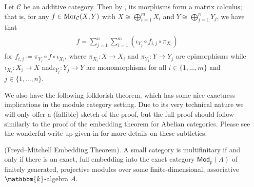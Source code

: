 \noindent\begin{remark}\label{MatrixCalculus} Let $\mathcal{C}$ be an additive category. Then by \cite[\S VIII.2]{Mac13}, its morphisms form a matrix calculus; that is, for any $f \in \textnormal{Mor}_\mathcal{C}(X, Y)$ with $X \cong \bigoplus_{i=1}^m{X_i}$ and $Y \cong \bigoplus_{j=1}^n{Y_j}$, we have that\\[-\linespacing]
\begin{align*}
\begin{split}
f = \sum_{j=1}^n{\sum_{i=1}^m{(\iota_{Y_j} \circ f_{i,j} \circ \pi_{X_i})}}
\end{split}
\end{align*}
\noindent for $f_{i,j} \coloneqq \pi_{Y_j} \circ f \circ \iota_{X_i}$, where $\pi_{X_i} : X \to X_i$ and $\pi_{Y_j} : Y \to Y_j$ are epimorphisms while $\iota_{X_i} : X_i \to X$ and\linebreak $\iota_{Y_j} : Y_j \to Y$ are monomorphisms for all $i \in \{1, \dots, m\}$ and $j \in \{1, \dots, n\}$.\\
\end{remark}

\noindent We also have the following folklorish theorem, which has some nice exactness implications in the module category setting. Due to its very technical nature we will only offer a (fallible) sketch of the proof, but the full proof should follow similarly to the proof of the embedding theorem for Abelian categories. Please see the wonderful write-up given in \cite{Jun19} for more details on these subtleties.\newpage

\noindent\begin{theorem}\textnormal{(Freyd--Mitchell Embedding Theorem).}\label{FreydMitchell} A small category is multifinitary if and only if there is an exact, full embedding into the exact category $\mathsf{Mod}_p(A)$ of finitely generated, projective modules over some finite-dimensional, associative $\mathbbm{k}$-algebra $A$.\\
\end{theorem}

